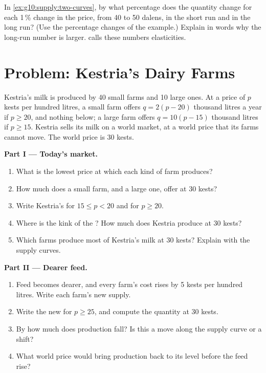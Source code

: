 \begin{exercise}[$\star\star\star$]\label{exo:g10:supply:15}
In \cref{ex:g10:supply:two-curves}, by what percentage does the quantity change for each 1\,\% change in the price, from 40 to 50 dalens, in the
short run and in the long run? (Use the percentage changes of the example.) Explain in words why the long-run number is larger.  calls these numbers
elasticities.
\end{exercise}

\section{Problem: Kestria's Dairy Farms}

\begin{problem}
\label{pb:g10:supply:1}
Kestria's milk is produced by 40 small farms and 10 large ones. At a price of $p$ kests per hundred litres, a small farm offers $q = 2(p - 20)$
thousand litres a year if $p \ge 20$, and nothing below; a large farm offers $q = 10(p - 15)$ thousand litres if $p \ge 15$. Kestria sells its milk
on a world market, at a world price that its farms cannot move. The world price is 30 kests.

\medskip
\noindent\textbf{Part I --- Today's market.}
\begin{enumerate}
\item What is the lowest price at which each kind of farm produces?
\item How much does a small farm, and a large one, offer at 30 kests?
\item Write Kestria's  for $15 \le p < 20$ and for $p \ge 20$.
\item Where is the kink of the ? How much does Kestria produce at 30 kests?
\item Which farms produce most of Kestria's milk at 30 kests? Explain with the supply curves.
\end{enumerate}

\medskip
\noindent\textbf{Part II --- Dearer feed.}
\begin{enumerate}[resume]
\item Feed becomes dearer, and every farm's cost rises by 5 kests per hundred litres. Write each farm's new supply.
\item Write the new  for $p \ge 25$, and compute the quantity at 30 kests.
\item By how much does production fall? Is this a move along the supply curve or a shift?
\item What world price would bring production back to its level before the feed rise?
\end{enumerate}


\end{problem}
